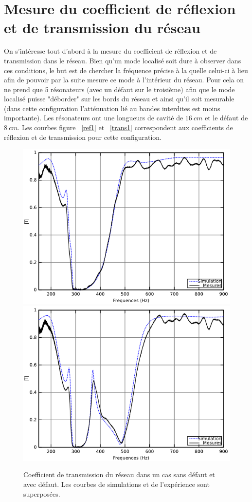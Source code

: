 \section{Mesure du coefficient de réflexion et de transmission du réseau}
On s'intéresse tout d'abord à la mesure du coefficient de réflexion et de transmission dans le réseau. Bien qu'un mode localisé soit dure à observer dans ces conditions, le but est de chercher la fréquence précise à la quelle celui-ci à lieu afin de pouvoir par la suite mesure ce mode à l'intérieur du réseau. Pour cela on ne prend que 5 résonateurs (avec un défaut sur le troisième) afin que le mode localisé puisse "déborder" sur les bords du réseau et ainsi qu'il soit mesurable (dans cette configuration l'atténuation lié au bandes interdites est moins importante). Les résonateurs ont une longueurs de cavité de $16~cm$ et le défaut de $8~cm$. Les courbes figure ~\ref{ref1} et ~\ref{trans1} correspondent aux coefficients de réflexion et de transmission pour cette configuration.

\begin{figure}[!h]
\centering
\includegraphics[scale=0.4]{images_chp3/5HR165_nodefect.png}\hfill
\includegraphics[scale=0.4]{images_chp3/5HR165_8cm_pos3.png}
\caption{\label{ref_trans1} Coefficient de transmission du réseau dans un cas sans défaut et avec défaut. Les courbes de simulations et de l’expérience sont superposées.}
\end{figure}

